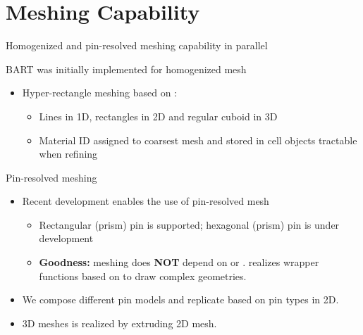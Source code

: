 \section{Meshing Capability}
\begin{frame}{Homogenized and pin-resolved meshing capability in parallel}
	\begin{block}{BART was initially implemented for homogenized mesh}
		\begin{itemize}
			\item Hyper-rectangle meshing based on :
			\begin{itemize}
				\item Lines in 1D, rectangles in 2D and regular cuboid in 3D
				\item Material ID assigned to coarsest mesh and stored in cell objects tractable when refining
			\end{itemize}
		\end{itemize}
	\end{block}
	\begin{block}{Pin-resolved meshing}
		\begin{itemize}
			\item Recent development enables the use of pin-resolved mesh
			\begin{itemize}
				\item Rectangular (prism) pin is supported; hexagonal (prism) pin is under development
				\item {\bf Goodness:} meshing does {\bf NOT} depend on  or .  realizes wrapper functions based on  to draw complex geometries.
			\end{itemize}
			\item We compose different pin models and replicate based on pin types in 2D.
			\item 3D meshes is realized by extruding 2D mesh.
		\end{itemize}
	\end{block}
\end{frame}


